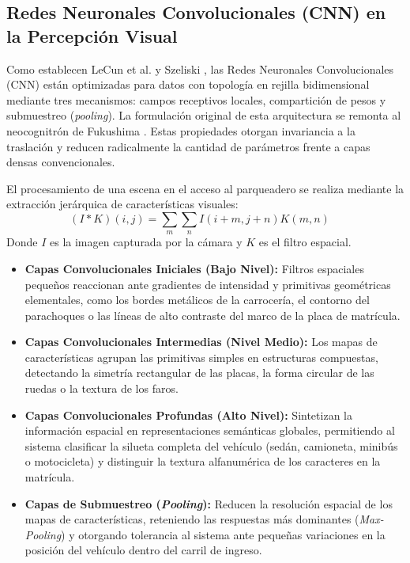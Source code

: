 \subsection{Redes Neuronales Convolucionales (CNN) en la Percepción Visual}

Como establecen LeCun et al. \cite{lecun2015deep} y Szeliski
\cite{szeliski2022computer}, las Redes Neuronales Convolucionales (CNN) están
optimizadas para datos con topología en rejilla bidimensional mediante tres
mecanismos: campos receptivos locales, compartición de pesos y submuestreo
(\textit{pooling}). La formulación original de esta arquitectura se remonta al
neocognitrón de Fukushima \cite{fukushima1980neocognitron}. Estas propiedades
otorgan invariancia a la traslación y
reducen radicalmente la cantidad de parámetros frente a capas densas
convencionales.

El procesamiento de una escena en el acceso al parqueadero se realiza mediante
la extracción jerárquica de características visuales:
\begin{equation}
    (I * K)(i, j) = \sum_{m} \sum_{n} I(i + m, j + n) K(m, n) \quad
\end{equation}
Donde $I$ es la imagen capturada por la cámara y $K$ es el filtro espacial.

\begin{itemize}
    \item \textbf{Capas Convolucionales Iniciales (Bajo Nivel):} Filtros
        espaciales pequeños reaccionan ante gradientes de intensidad y primitivas
        geométricas elementales, como los bordes metálicos de la carrocería, el
        contorno del parachoques o las líneas de alto contraste del marco de la
        placa de matrícula.

    \item \textbf{Capas Convolucionales Intermedias (Nivel Medio):} Los mapas de
        características agrupan las primitivas simples en estructuras compuestas,
        detectando la simetría rectangular de las placas, la forma circular de
        las ruedas o la textura de los faros.

    \item \textbf{Capas Convolucionales Profundas (Alto Nivel):} Sintetizan la
        información espacial en representaciones semánticas globales,
        permitiendo al sistema clasificar la silueta completa del vehículo 
        (sedán, camioneta, minibús o motocicleta) y distinguir la textura
        alfanumérica de los caracteres en la matrícula.

    \item \textbf{Capas de Submuestreo (\textit{Pooling}):} Reducen la resolución
        espacial de los mapas de características, reteniendo las respuestas más
        dominantes (\textit{Max-Pooling}) y otorgando tolerancia al sistema ante
        pequeñas variaciones en la posición del vehículo dentro del carril de
        ingreso.
\end{itemize}

